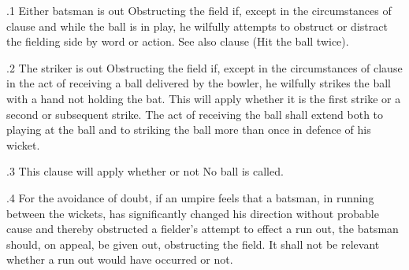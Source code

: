 \documentclass[12pt]{article}
\begin{document}
\vspace{\baselineskip}
\begin{adjustwidth}{0.5in}{0.12in}
\begin{justify}
{\fontsize{9pt}{10.8pt}.1 \tabto{0.49in} Either batsman is out Obstructing the field if, except in the circumstances of clause and while the ball is in play, he wilfully attempts to obstruct or distract the fielding side by word or action. See also clause  (Hit the ball twice).\par}
\end{justify}\par

\end{adjustwidth}


\vspace{\baselineskip}
\begin{adjustwidth}{0.5in}{0.06in}
{\fontsize{9pt}{10.8pt}.2 \tabto{0.49in} The striker is out Obstructing the field if, except in the circumstances of clause in the act of receiving a ball delivered by the bowler, he wilfully strikes the ball with a hand not holding the bat. This will apply whether it is the first strike or a second or subsequent strike. The act of receiving the ball shall extend both to playing at the ball and to striking the ball more than once in defence of his wicket.\par}\par

\end{adjustwidth}


\vspace{\baselineskip}
{\fontsize{9pt}{10.8pt}.3 \tabto{0.49in} This clause will apply whether or not No ball is called.\par}\par


\vspace{\baselineskip}
\begin{adjustwidth}{0.5in}{0.01in}
{\fontsize{9pt}{10.8pt}.4 \tabto{0.49in} For the avoidance of doubt, if an umpire feels that a batsman, in running between the wickets, has significantly changed his direction without probable cause and thereby obstructed a fielder’s attempt to effect a run out, the batsman should, on appeal, be given out, obstructing the field. It shall not be relevant whether a run out would have occurred or not.\par}\par

\end{adjustwidth}
\end{document}
